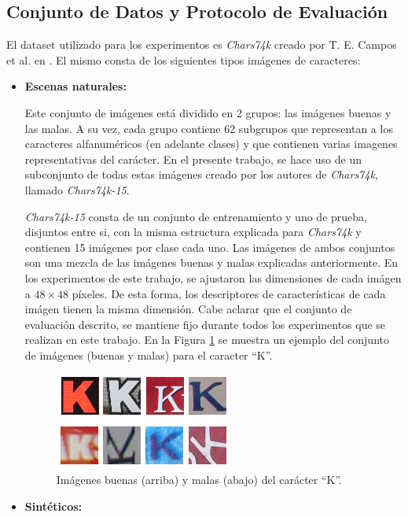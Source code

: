 \subsection{Conjunto de Datos y Protocolo de Evaluación}
\label{subsection:evaluacion}


	El dataset utilizado para los experimentos es \textit{Chars74k} creado por T. E. Campos et al. en \cite{dCBV09}. El mismo consta de los siguientes tipos imágenes de caracteres: 
	\begin{itemize}
		\item \textbf{Escenas naturales:}
		
		Este conjunto de imágenes está dividido en 2 grupos: las imágenes buenas y las malas. A su vez, cada grupo contiene 62 subgrupos que representan a los caracteres alfanuméricos (en adelante clases) y que contienen varias imagenes representativas del carácter. En el presente trabajo, se hace uso de un subconjunto de todas estas imágenes creado por los autores de \textit{Chars74k}, llamado \textit{Chars74k-15}.
		
		\textit{Chars74k-15} consta de un conjunto de entrenamiento y uno de prueba, disjuntos entre si, con la misma estructura explicada para \textit{Chars74k} y contienen 15 imágenes por clase cada uno. Las imágenes de ambos conjuntos son una mezcla de las imágenes buenas y malas explicadas anteriormente. En los experimentos de este trabajo, se ajustaron las dimensiones de cada imágen a $48 \times 48$ píxeles. De esta forma, los descriptores de características de cada imágen tienen la misma dimensión. Cabe aclarar que el conjunto de evaluación descrito, se mantiene fijo durante todos los experimentos que se realizan en este trabajo. En la Figura \ref{fig: chars74k-reales} se muestra un ejemplo del conjunto de imágenes (buenas y malas) para el caracter ``K''.
		\begin{figure}[htbp]
			\centering
				\includegraphics[scale=1]{img/img_buenas_malas.png}
				\caption[Chars74k reales]{Imágenes buenas (arriba) y malas (abajo) del carácter ``K''.}
			\label{fig: chars74k-reales}
		\end{figure}	
		
	\item \textbf{Sintéticos:}
	

\end{itemize}
